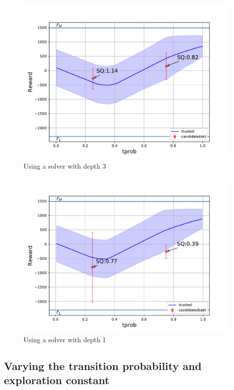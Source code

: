 \begin{figure}[tbp]
    \centering
    \includegraphics[width=0.9\linewidth]{Figures/transition_vary_tprob_ok.pdf}
    \caption{Using a solver with depth 3}
    \label{fig:tprob}
\end{figure}
\begin{figure}[tbp]
    \centering
    \includegraphics[width=0.9\linewidth]{Figures/transition_vary_tprob_bad.pdf}
    \caption{Using a solver with depth 1}
    \label{fig:tprob}
\end{figure}

\subsection{Varying the transition probability and exploration constant}

